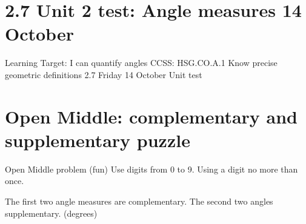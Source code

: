 \section{2.7 Unit 2 test: Angle measures \hfill 14 October}
\begin{frame}{Learning Target: I can quantify angles}
  {CCSS: HSG.CO.A.1 Know precise geometric definitions \hfill \alert{2.7 Friday 14 October}}
    \alert{Unit test}
  \end{frame}

\section{Open Middle: complementary and supplementary puzzle}
\begin{frame}{Open Middle problem (fun)}
  {Use digits from 0 to 9. Using a digit no more than once.}
    \begin{block}{The first two angle measures are complementary. The second two angles supplementary. (degrees)}
      \begin{center}
    \end{center}
    \end{block} \vspace{1cm} 
\end{frame}



